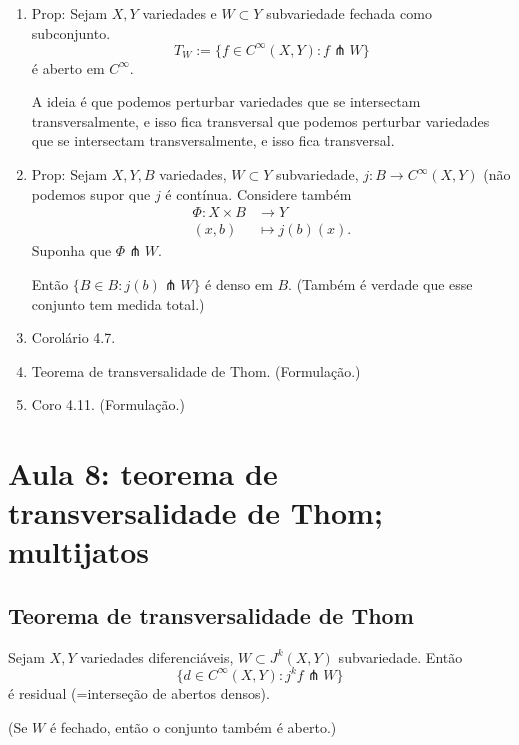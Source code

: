 \begin{enumerate}
\item Prop: Sejam \(X,Y\) variedades e \(W \subset Y\) subvariedade fechada como subconjunto. \[T_W:= \{f \in C^\infty(X,Y): f \pitchfork W\}\]
é aberto em \(C^\infty\).

{\color{7}A ideia é que podemos perturbar variedades que se intersectam transversalmente, e isso fica transversal que podemos perturbar variedades que se intersectam transversalmente, e isso fica transversal.}

\item Prop: Sejam \(X,Y,B\) variedades, \(W \subset Y\) subvariedade, \(j:B \to C^\infty(X,Y)\) (não podemos supor que \(j\) é contínua. Considere também
\begin{align*}
	\Phi: X \times B &\longrightarrow Y \\
	(x,b) &\longmapsto j(b)(x).
\end{align*}
Suponha que \(\Phi \pitchfork W\).

Então \(\{ B \in B : j(b) \pitchfork W\}\) é denso em \(B\). (Também é verdade que esse conjunto tem medida total.)
	
\item Corolário 4.7.
\item Teorema de transversalidade de Thom. (Formulação.)
\item Coro 4.11. (Formulação.)

\end{enumerate}

\section{Aula 8: teorema de transversalidade de Thom; multijatos}

\subsection{Teorema de transversalidade de Thom}

\begin{thm}\leavevmode
Sejam \(X, Y\) variedades diferenciáveis, \(W \subset J^k(X,Y)\) subvariedade. Então
\[\{ d \in C^\infty (X,Y): j^kf \pitchfork W\}\]
é residual (=interseção de abertos densos).

(Se \(W\) é fechado, então o conjunto também é aberto.)
\end{thm}

